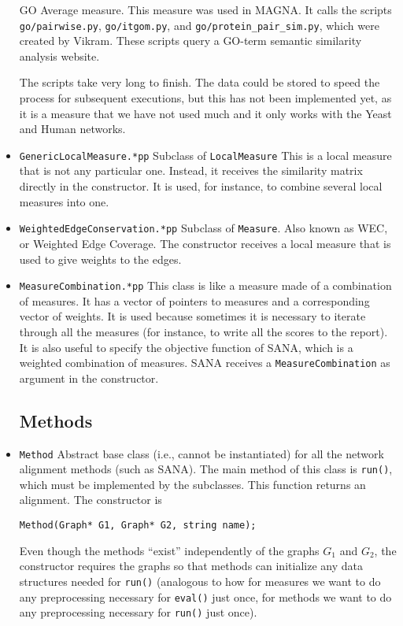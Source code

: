\documentclass[]{article}
\begin{document}
\begin{itemize}
GO Average measure. This measure was used in MAGNA. It calls the scripts \texttt{go/pairwise.py}, \texttt{go/itgom.py}, and \texttt{go/protein\_pair\_sim.py}, which were created by Vikram. These scripts query a GO-term semantic similarity analysis website.

The scripts take very long to finish. The data could be stored to speed the process for subsequent executions, but this has not been implemented yet, as it is a measure that we have not used much and it only works with the Yeast and Human networks.

\item \texttt{GenericLocalMeasure.*pp} Subclass of \texttt{LocalMeasure} This is a local measure that is not any particular one. Instead, it receives the similarity matrix directly in the constructor. It is used, for instance, to combine several local measures into one.

\item \texttt{WeightedEdgeConservation.*pp} Subclass of \texttt{Measure}. Also known as WEC, or Weighted Edge Coverage. The constructor receives a local measure that is used to give weights to the edges.

\item \texttt{MeasureCombination.*pp} This class is like a measure made of a combination of measures. It has a vector of pointers to measures and a corresponding vector of weights. It is used because sometimes it is necessary to iterate through all the measures (for instance, to write all the scores to the report). It is also useful to specify the objective function of SANA, which is a weighted combination of measures. SANA receives a \texttt{MeasureCombination} as argument in the constructor.

\subsection{Methods}\label{methods}

\item \texttt{Method} Abstract base class (i.e., cannot be instantiated) for all the network alignment methods (such as SANA). The main method of this class is \texttt{run()}, which must be implemented by the subclasses. This function returns an alignment. The constructor is
\begin{verbatim}
Method(Graph* G1, Graph* G2, string name);
\end{verbatim}
Even though the methods ``exist'' independently of the graphs $G_1$ and $G_2$, the constructor requires the graphs so that methods can initialize any data structures needed for \texttt{run()} (analogous to how for measures we want to do any preprocessing necessary for \texttt{eval()} just once, for methods we want to do any preprocessing necessary for \texttt{run()} just once).


\end{itemize}
\end{document}
